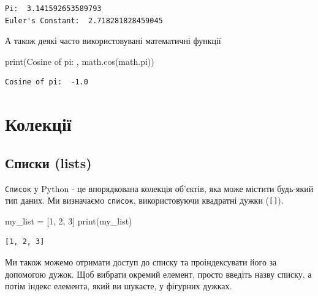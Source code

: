\documentclass[
  letterpaper,
]{report}
\newenvironment{Shaded}{\begin{snugshade}}{\end{snugshade}}
\newcommand{\BuiltInTok}[1]{\textcolor[rgb]{0.00,0.23,0.31}{#1}}
\newcommand{\DecValTok}[1]{\textcolor[rgb]{0.68,0.00,0.00}{#1}}
\newcommand{\NormalTok}[1]{\textcolor[rgb]{0.00,0.23,0.31}{#1}}
\newcommand{\OperatorTok}[1]{\textcolor[rgb]{0.37,0.37,0.37}{#1}}
\newcommand{\StringTok}[1]{\textcolor[rgb]{0.13,0.47,0.30}{#1}}
\begin{document}
\begin{verbatim}
Pi:  3.141592653589793
Euler's Constant:  2.718281828459045
\end{verbatim}

А також деякі часто використовувані математичні функції

\begin{Shaded}
\begin{Highlighting}[]
\BuiltInTok{print}\NormalTok{(}\StringTok{\textquotesingle{}Cosine of pi: \textquotesingle{}}\NormalTok{, math.cos(math.pi))}
\end{Highlighting}
\end{Shaded}

\begin{verbatim}
Cosine of pi:  -1.0
\end{verbatim}

\hypertarget{ux43aux43eux43bux435ux43aux446ux456ux457}{%
\section{Колекції}\label{ux43aux43eux43bux435ux43aux446ux456ux457}}

\hypertarget{ux441ux43fux438ux441ux43aux438-lists}{%
\subsection{Списки (lists)}\label{ux441ux43fux438ux441ux43aux438-lists}}

\texttt{Список} у Python - це впорядкована колекція об'єктів, яка може
містити будь-який тип даних. Ми визначаємо \texttt{список},
використовуючи квадратні дужки (\texttt{{[}{]}}).

\begin{Shaded}
\begin{Highlighting}[]
\NormalTok{my\_list }\OperatorTok{=}\NormalTok{ [}\DecValTok{1}\NormalTok{, }\DecValTok{2}\NormalTok{, }\DecValTok{3}\NormalTok{]}
\BuiltInTok{print}\NormalTok{(my\_list)}
\end{Highlighting}
\end{Shaded}

\begin{verbatim}
[1, 2, 3]
\end{verbatim}

Ми також можемо отримати доступ до списку та проіндексувати його за
допомогою дужок. Щоб вибрати окремий елемент, просто введіть назву
списку, а потім індекс елемента, який ви шукаєте, у фігурних дужках.
\end{document}
